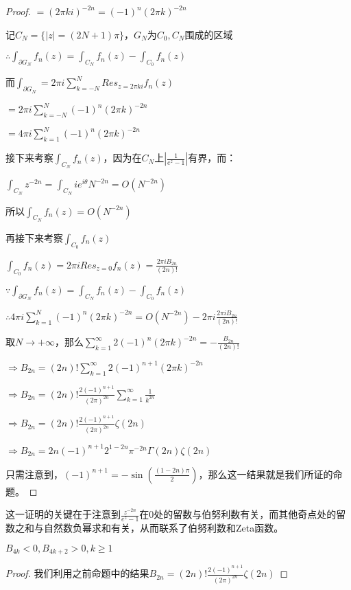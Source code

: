 \documentclass[12pt, a4paper, oneside, UTF8]{ctexbook}
\begin{document}
\begin{para}{0}
\begin{para}{1}
\begin{proof}
						$=(2\pi ki)^{-2n}=(-1)^n (2\pi k)^{-2n}$
						
						记$C_N = \{|z|=(2N+1)\pi\}$，$G_N$为$C_0,C_N$围成的区域
						
						$\therefore \int_{\partial G_N} f_n(z)=\int_{C_N} f_n(z)-\int_{C_0} f_n(z)$
						
						而$\int_{\partial G_N} = 2\pi i \sum\limits_{k=-N}^{N} Res_{z=2\pi ki} f_n(z)$
						
						$=2\pi i \sum\limits_{k=-N}^{N} (-1)^n (2\pi k)^{-2n}$
						
						$=4\pi i \sum\limits_{k=1}^{N} (-1)^n (2\pi k)^{-2n}$
						
						接下来考察$\int_{C_N} f_n(z)$，因为在$C_N$上$|\frac{1}{e^z-1}|$有界，而：
						
						$\int_{C_N} z^{-2n} = \int_{C_N} i e^{i\theta} N^{-2n} = O(N^{-2n})$
						
						所以$\int_{C_N} f_n(z) = O(N^{-2n})$
						
						再接下来考察$\int_{C_0} f_n(z)$
						
						$\int_{C_0} f_n(z) = 2\pi i Res_{z=0} f_n(z) = \frac{2\pi i B_{2n}}{(2n)!}$
						
						$\because \int_{\partial G_N} f_n(z)=\int_{C_N} f_n(z)-\int_{C_0} f_n(z)$
						
						$\therefore 4\pi i \sum\limits_{k=1}^{N} (-1)^n (2\pi k )^{-2n} = O(N^{-2n})-2\pi i\frac{2\pi i B_{2n}}{(2n)!}$
						
						取$N\to +\infty$，那么$\sum\limits_{k=1}^{\infty} 2(-1)^n (2\pi k)^{-2n}=-\frac{B_{2n}}{(2n)!}$
						
						$\Rightarrow B_{2n} = (2n)!\sum\limits_{k=1}^{\infty} 2(-1)^{n+1} (2\pi k)^{-2n}$
						
						$\Rightarrow B_{2n} = (2n)!\frac{2(-1)^{n+1}}{(2\pi)^{2n}}\sum\limits_{k=1}^{\infty} \frac{1}{k^{2n}}$
						
						$\Rightarrow B_{2n} = (2n)!\frac{2(-1)^{n+1}}{(2\pi)^{2n}}\zeta(2n)$
						
						$\Rightarrow B_{2n} = 2n (-1)^{n+1} 2^{1-2n} \pi^{-2n} \Gamma(2n)\zeta(2n)$
						
						只需注意到，$(-1)^{n+1}=-\sin\left(\frac{(1-2n)\pi}{2}\right)$，那么这一结果就是我们所证的命题。
					\end{proof}
					这一证明的关键在于注意到$\frac{z^{-2n}}{e^z-1}$在$0$处的留数与伯努利数有关，而其他奇点处的留数之和与自然数负幂求和有关，从而联系了伯努利数和Zeta函数。
						\begin{proposition}
							$B_{4k} < 0,B_{4k+2} > 0,k \geqslant 1$
						\end{proposition}
						\begin{proof}
							我们利用之前命题中的结果$B_{2n} = (2n)!\frac{2(-1)^{n+1}}{(2\pi)^{2n}}\zeta(2n)$
							

\end{proof}
\end{para}
\end{para}
\end{document}
